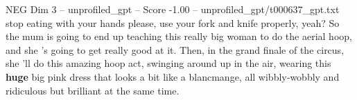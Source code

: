 \begin{textsample}{NEG Dim 3 – unprofiled\_gpt – Score -1.00 – unprofiled\_gpt/t000637\_gpt.txt}  \label{ex:f3_neg_014}
stop eating with your hands please, use your fork and knife properly, yeah?
So the mum is going to end up teaching this really big woman to do the aerial hoop, and she ’s going to get really good at it.
Then, in the grand finale of the circus, she ’ll do this amazing hoop act, swinging around up in the air, wearing this \textbf{huge} big pink dress that looks a bit like a blancmange, all wibbly‑wobbly and ridiculous but brilliant at the same time.

\end{textsample}
